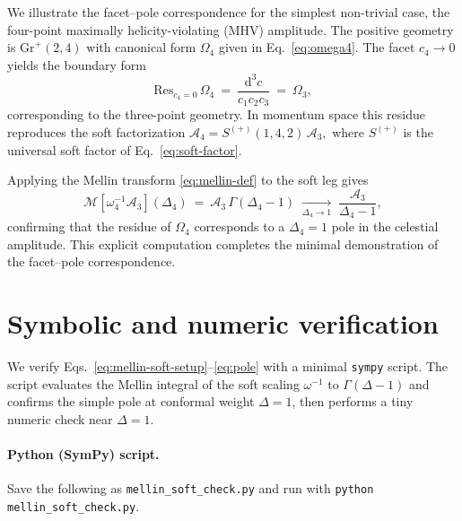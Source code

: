 \documentclass[11pt]{article}
\begin{document}
We illustrate the facet--pole correspondence for the simplest non-trivial case, the four-point maximally helicity-violating (MHV) amplitude.  
The positive geometry is $\mathrm{Gr}^+(2,4)$ with canonical form $\Omega_4$ given in Eq.~\eqref{eq:omega4}.  
The facet $c_4\!\to\!0$ yields the boundary form
\begin{equation}
\text{Res}_{c_4=0}\,\Omega_4
~=~
\frac{\mathrm{d}^3 c}{c_1 c_2 c_3}
~=~
\Omega_3,
\label{eq:omega4-residue}
\end{equation}
corresponding to the three-point geometry.  
In momentum space this residue reproduces the soft factorization
\(
\mathcal{A}_4 = S^{(+)}(1,4,2)\,\mathcal{A}_3,
\)
where $S^{(+)}$ is the universal soft factor of Eq.~\eqref{eq:soft-factor}.

Applying the Mellin transform \eqref{eq:mellin-def} to the soft leg gives
\[
\mathcal{M}[\omega_4^{-1}\mathcal{A}_3](\Delta_4)
~=~
\mathcal{A}_3\,\Gamma(\Delta_4-1)
\;\xrightarrow[\Delta_4\to1]{}\;
\frac{\mathcal{A}_3}{\Delta_4-1},
\]
confirming that the residue of $\Omega_4$ corresponds to a $\Delta_4=1$ pole in the celestial amplitude.  
This explicit computation completes the minimal demonstration of the facet–pole correspondence.

\section{Symbolic and numeric verification}
\label{app:verification}

We verify Eqs.~\eqref{eq:mellin-soft-setup}--\eqref{eq:pole} with a minimal \texttt{sympy} script. The script evaluates the Mellin integral of the soft scaling $\omega^{-1}$ to $\Gamma(\Delta-1)$ and confirms the simple pole at conformal weight $\Delta=1$, then performs a tiny numeric check near $\Delta=1$.

\paragraph{Python (SymPy) script.} Save the following as \texttt{mellin\_soft\_check.py} and run with \texttt{python mellin\_soft\_check.py}.
\end{document}
